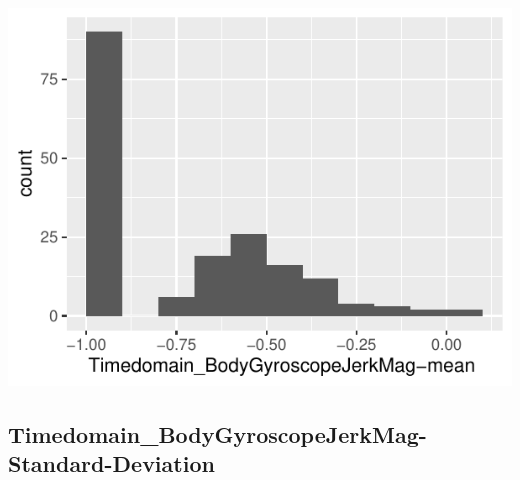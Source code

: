 \documentclass[
]{article}
\begin{document}
\begin{minipage}{0.25 \textwidth}

\includegraphics{codebook_tidydatasub_files/figure-latex/Var-41-Timedomain-BodyGyroscopeJerkMag-mean--1.pdf}

\end{minipage}

\noindent\makebox[\linewidth]{\rule{\textwidth}{0.4pt}}

\hypertarget{timedomain_bodygyroscopejerkmag-standard-deviation}{%
\subsection{Timedomain\_BodyGyroscopeJerkMag-Standard-Deviation}\label{timedomain_bodygyroscopejerkmag-standard-deviation}}
\end{document}
